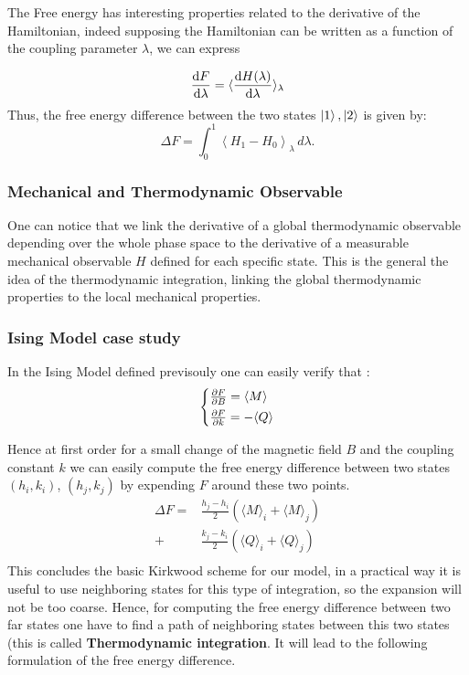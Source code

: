 \documentclass[ansiapaper]{report}
\begin{document}
\begin{multicols}{3}
The Free energy has interesting properties related to the derivative of the Hamiltonian, indeed supposing the Hamiltonian can be written as a function of the coupling parameter $\lambda$, we can express 

$$\dv{F}{\lambda} = \langle \dv{H(\lambda)}{\lambda} \rangle_{\lambda}$$
Thus, the free energy difference between the two states $\ket{1}, \ket{2}$ is given by:
\[
\Delta F = \int_0^1 \left\langle H_1 - H_0 \right\rangle_{\lambda} \, d\lambda.
\]
\subsubsection{Mechanical and Thermodynamic Observable}
One can notice that we link the derivative of a global thermodynamic observable depending over the whole phase space to the derivative of a measurable mechanical observable $H$ defined for each specific state. This is the general the idea of the thermodynamic integration, linking the global thermodynamic properties to the local mechanical properties. 
\subsubsection{Ising Model case study}
In the Ising Model defined previsouly one can easily verify that : 
 $$
 \begin{cases*}
     \pdv{F}{B} = \langle M \rangle \\
     \pdv{F}{k} = - \langle Q \rangle
\end{cases*}
$$

Hence at first order for a small change of the magnetic field $B$ and the coupling constant $k$ we can easily compute the free energy difference between two states $(h_i, k_i)$, $(h_j, k_j)$ by expending $F$ around these two points. 
\begin{equation*}
\begin{split}
    \Delta F = &\frac{h_j - h_i}{2} (\langle M \rangle_i + \langle M \rangle_j)\\
    +&\frac{k_j- k_i}{2} (\langle Q \rangle_i + \langle Q \rangle_j)\\
\end{split}
\end{equation*}
This concludes the basic Kirkwood scheme for our model, in a practical way it is useful to use neighboring states for this type of integration, so the expansion will not be too coarse. Hence, for computing the free energy difference between two far states one have to find a path of neighboring states between this two states (this is called \textbf{Thermodynamic integration}. It will lead to the following formulation of the free energy difference. 


\end{multicols}
\end{document}
